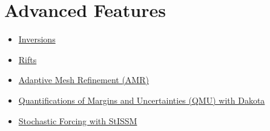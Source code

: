
\section{Advanced Features} \label{sec:using-issm-advanced}
\begin{itemize}
	\item \hyperref[sec:using-issm-advanced-inversions]{Inversions}
	\item \hyperref[sec:using-issm-advanced-rifts]{Rifts}
	\item \hyperref[sec:using-issm-advanced-amr]{Adaptive Mesh Refinement (AMR)}
	\item \hyperref[sec:using-issm-advanced-qmu-dakota]{Quantifications of Margins and Uncertainties (QMU) with Dakota}
	\item \hyperref[sec:using-issm-advanced-stochastic-forcing]{Stochastic Forcing with StISSM}
\end{itemize}

\clearpage %
